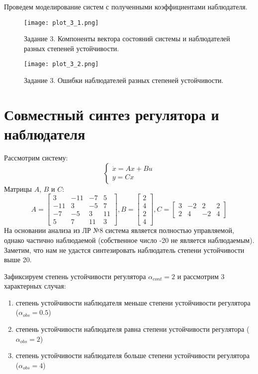 Проведем моделирование систем с полученными коэффициентами наблюдателя.

\begin{figure}[]
    \centering
    \texttt{[image: plot\_3\_1.png]}
    \caption{\label{fig:The-caption-1}Задание 3. Компоненты вектора состояний системы и наблюдателей разных степеней устойчивости.}
\end{figure}
\begin{figure}[]
    \centering
    \texttt{[image: plot\_3\_2.png]}
    \caption{\label{fig:The-caption-1}Задание 3. Ошибки наблюдателей разных степеней устойчивости.}
\end{figure}

\pagebreak

\section{Совместный синтез регулятора и наблюдателя}
Рассмотрим систему:
\begin{equation}
    \begin{cases}
        \dot x = Ax + Bu \\
        y = Cx
    \end{cases}
\end{equation}
Матрицы $A$, $B$ и $C$:
\begin{equation*}
    A = \begin{bmatrix}
        3 & -11 & -7 & 5 \\
        -11 & 3 & -5 & 7 \\
        -7 & -5 & 3 & 11 \\
        5 & 7 & 11 & 3
    \end{bmatrix},
    B = \begin{bmatrix}
        2 \\ 4 \\ 2 \\ 4
    \end{bmatrix},
    C = \begin{bmatrix}
        3 & -2 & 2 & 2 \\
        2 & 4 & -2 & 4
    \end{bmatrix}
\end{equation*}
На основании анализа из ЛР №8 система является полностью управляемой, однако частично наблюдаемой 
(собственное число -20 не является наблюдаемым). Заметим, что нам не удастся синтезировать наблюдатель степени устойчивости выше 20.

Зафиксируем степень устойчивости регулятора $\alpha_{cont}=2$ и рассмотрим 3 характерных случая:
\begin{enumerate}
    \item степень устойчивости наблюдателя меньше степени устойчивости регулятора ($\alpha_{obs}=0.5$)
    \item степень устойчивости наблюдателя равна степени устойчивости регулятора ($\alpha_{obs}=2$)
    \item  степень устойчивости наблюдателя больше степени устойчивости регулятора ($\alpha_{obs}=4$)
\end{enumerate}

